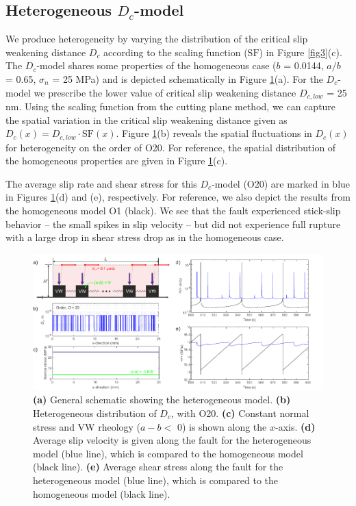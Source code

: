 \documentclass[preprint,1p, 10pt,authoryear]{elsarticle}
\begin{document}
\subsection{Heterogeneous $D_{c}$-model}
We produce heterogeneity by varying the distribution of the critical slip weakening distance $D_{c}$ according to the scaling function ($\mathrm{SF}$) in Figure \ref{fig3}(c). The $D_{c}$-model shares some properties of the homogeneous case ($b$ = 0.0144, $a/b$ = 0.65, $\sigma_{n}$ = 25 MPa) and is depicted schematically in Figure \ref{fig6}(a). For the $D_{c}$-model we prescribe the lower value of critical slip weakening distance $D_{c,low}$ = 25 nm. Using the scaling function from the cutting plane method, we can capture the spatial variation in the critical slip weakening distance given as $D_{c}(x) = D_{c,low} \cdot \mathrm{SF}(x)$. Figure \ref{fig6}(b) reveals the spatial fluctuations in $D_{c}(x)$ for heterogeneity on the order of O20. For reference, the spatial distribution of the homogeneous properties are given in Figure \ref{fig6}(c).
 
The average slip rate and shear stress for this $D_{c}$-model (O20) are marked in blue in Figures \ref{fig6}(d) and (e), respectively. For reference, we also depict the results from the homogeneous model O1 (black). We see that the fault experienced stick-slip behavior -- the small spikes in slip velocity -- but did not experience full rupture with a large drop in shear stress drop as in the homogeneous case. 

 \begin{figure}
	\centering
	\includegraphics{FIG6_revised.pdf} 
	\caption{\textbf{(a)} General schematic showing the heterogeneous model. \textbf{(b)} Heterogeneous distribution of $D_{c}$, with O20. \textbf{(c)} Constant normal stress and VW rheology ($a-b <$ 0) is shown along the $x$-axis.  \textbf{(d)} Average slip velocity is given along the fault for the heterogeneous model (blue line), which is compared to the homogeneous model (black line). \textbf{(e)} Average shear stress along the fault for the heterogeneous model (blue line), which is compared to the homogeneous model (black line).}
	\label{fig6}
\end{figure}
 
\end{document}
